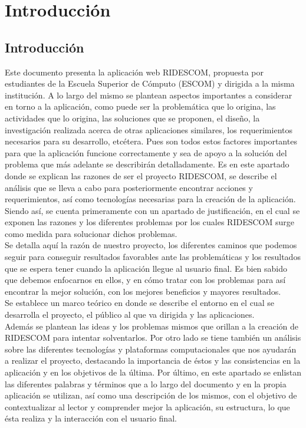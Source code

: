 \chapter{Introducción}
	\section{Introducci\'on}
	Este documento presenta la aplicación web RIDESCOM, propuesta por estudiantes de la Escuela Superior de Cómputo (ESCOM) y dirigida a la misma institución. A lo largo del mismo se plantean aspectos importantes a considerar en torno a la aplicación, como puede ser la problemática que lo origina, las actividades que lo origina, las soluciones que se proponen, el diseño, la investigación realizada acerca de otras aplicaciones similares, los requerimientos necesarios para su desarrollo, etcétera. Pues son todos estos factores importantes para que la aplicación funcione correctamente y sea de apoyo a la solución del problema que más adelante se describirán detalladamente. Es en este apartado donde se explican las razones de ser el proyecto RIDESCOM, se describe el análisis que se lleva a cabo para posteriormente encontrar acciones y requerimientos, así como tecnologías necesarias para la creación de la aplicación. 
	Siendo así, se cuenta primeramente con un apartado de justificación, en el cual se exponen las razones y los diferentes problemas por los cuales RIDESCOM surge como medida para solucionar dichos problemas.\\
	Se detalla aquí la razón de nuestro proyecto, los diferentes caminos que podemos seguir para conseguir resultados favorables ante las problemáticas y los resultados que se espera tener cuando la aplicación llegue al usuario final. Es bien sabido que debemos enfocarnos en ellos, y en cómo tratar con los problemas para así encontrar la mejor solución, con los mejores beneficios y mayores resultados.\\
	Se establece un marco teórico en donde se describe el entorno en el cual se desarrolla el proyecto, el público al que va dirigida y las aplicaciones.\\
	Además se plantean las ideas y los problemas mismos que orillan a la creación de RIDESCOM para intentar solventarlos. Por otro lado se tiene también un análisis sobre las diferentes tecnologías y plataformas computacionales que nos ayudarán a realizar el proyecto, destacando la importancia de éstos y las consistencias en la aplicación y en los objetivos de la última. Por último, en este apartado se enlistan las diferentes palabras y términos que a lo largo del documento y en la propia aplicación se utilizan, así como una descripción de los mismos, con el objetivo de contextualizar al lector y comprender mejor la aplicación, su estructura, lo que ésta realiza y la interacción con el usuario final.\\

